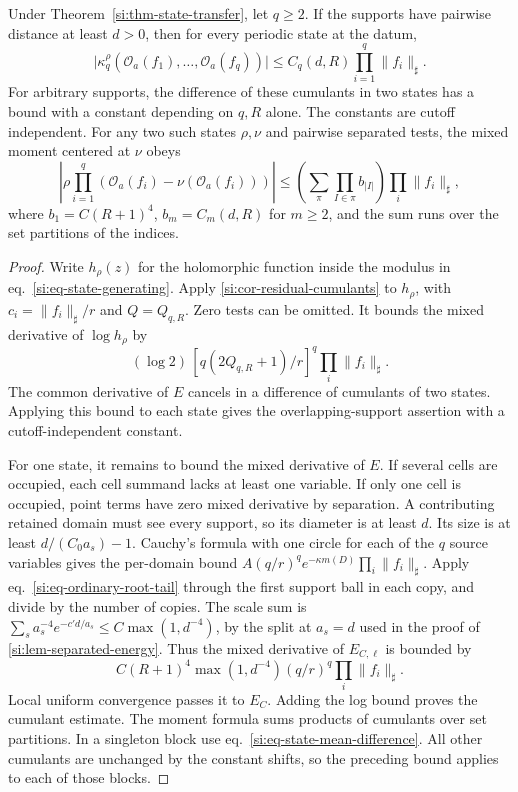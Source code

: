 \documentclass[11pt,letterpaper,reqno]{amsart}
\makeatletter
\numberwithin{equation}{section}
\renewcommand{\eqref}[1]{\textup{eq.~\ref{#1}}}
\theoremstyle{definition}
\newcommand{\ms@majorstart}{%
  \pushQED{\qed}\renewcommand{\qedsymbol}{$\blacksquare\square$}}
\newenvironment{corollary}[1][]{\ms@majorstart\ms@corollary[#1]}
  {\popQED\endms@corollary}
\theoremstyle{remark}
\makeatother
\begin{document}
\begin{samepage}
\begin{corollary}[Separated cumulants]\label{si:cor-state-cumulants}
Under Theorem~\ref{si:thm-state-transfer}, let $q\ge2$.
If the supports have pairwise distance at least $d>0$, then
for every periodic state at the datum,
\[
 \bigl|\kappa_q^\rho(\mathcal O_a(f_1),\ldots,\mathcal O_a(f_q))\bigr|
 \le C_q(d,R)\prod_{i=1}^q\|f_i\|_\sharp.
\]
For arbitrary supports, the difference of these cumulants in two
states has a bound with a constant depending on $q,R$ alone.
The constants are cutoff independent.
For any two such states $\rho,\nu$ and pairwise separated tests,
the mixed moment centered at $\nu$ obeys
\[
 \left|\rho\prod_{i=1}^q
       (\mathcal O_a(f_i)-\nu(\mathcal O_a(f_i)))\right|
 \le \left(\sum_{\pi}\prod_{I\in\pi} b_{|I|}\right)
                         \prod_i\|f_i\|_\sharp,
\]
where $b_1=C(R+1)^4$, $b_m=C_m(d,R)$ for $m\ge2$, and the sum
runs over the set partitions of the indices.
\end{corollary}
\end{samepage}
\begin{proof}
Write $h_\rho(z)$ for the holomorphic function inside the modulus
in \eqref{si:eq-state-generating}. Apply \cref{si:cor-residual-cumulants} to $h_\rho$,
with $c_i=\|f_i\|_\sharp/r$ and $Q=Q_{q,R}$. Zero tests can be
omitted. It bounds the mixed derivative of $\log h_\rho$ by
\[
 (\log2)\,[q(2Q_{q,R}+1)/r]^q\prod_i\|f_i\|_\sharp.
\]
The common derivative of $E$ cancels in a difference of cumulants
of two states. Applying this bound to each state gives the
overlapping-support assertion with a cutoff-independent constant.

For one state, it remains to bound the mixed derivative of $E$.
If several cells are occupied, each cell summand lacks at least
one variable. If only one cell is occupied, point terms have zero
mixed derivative by separation. A contributing retained domain
must see every support, so its diameter is at least $d$. Its size is at least $d/(C_0 a_s)-1$. Cauchy's formula with
one circle for each of the $q$ source variables gives the
per-domain bound
$A(q/r)^q e^{-\kappa m(D)}\prod_i\|f_i\|_\sharp$.
Apply \eqref{si:eq-ordinary-root-tail} through the first support
ball in each copy, and divide by the number of copies. The scale
sum is $\sum_s a_s^{-4}e^{-c'd/a_s}\le C\max(1,d^{-4})$,
by the split at $a_s=d$ used in the proof of
\cref{si:lem-separated-energy}. Thus the mixed derivative of
$E_{C,\ell}$ is bounded by
\[
 C(R+1)^4\max(1,d^{-4})(q/r)^q\prod_i\|f_i\|_\sharp .
\]
Local uniform convergence passes it to $E_C$.
Adding the log bound proves the cumulant estimate. The moment
formula sums products of cumulants over set partitions. In a
singleton block use \eqref{si:eq-state-mean-difference}. All other
cumulants are unchanged by the constant shifts, so the preceding
bound applies to each of those blocks.
\end{proof}
\end{document}
